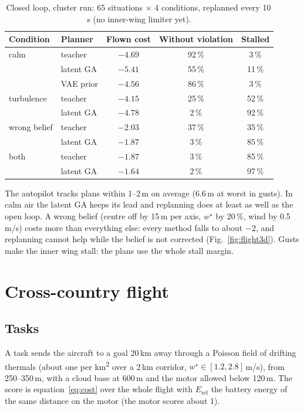 \documentclass[11pt,a4paper,oneside]{report}
\begin{document}
\begin{table}[ht]\centering\small
\caption{Closed loop, cluster run: 65 situations $\times$ 4 conditions, replanned every 10\,s (no inner-wing limiter yet).}\label{tab:closedloop}
\begin{tabular}{@{}llccc@{}}
\toprule
Condition & Planner & Flown cost & Without violation & Stalled \\ \midrule
calm & teacher & $-4.69$ & 92\,\% & 3\,\% \\
     & latent GA & $\mathbf{-5.41}$ & 55\,\% & 11\,\% \\
     & VAE prior & $-4.56$ & 86\,\% & 3\,\% \\ \midrule
turbulence & teacher & $-4.15$ & 25\,\% & 52\,\% \\
           & latent GA & $-4.78$ & 2\,\% & 92\,\% \\ \midrule
wrong belief & teacher & $-2.03$ & 37\,\% & 35\,\% \\
             & latent GA & $-1.87$ & 3\,\% & 85\,\% \\ \midrule
both & teacher & $-1.87$ & 3\,\% & 85\,\% \\
     & latent GA & $-1.64$ & 2\,\% & 97\,\% \\
\bottomrule
\end{tabular}
\end{table}

The autopilot tracks plans within 1--2\,m on average (6.6\,m at worst in gusts). In calm air the latent GA keeps its lead and replanning does at least as well as the open loop. A wrong belief (centre off by 15\,m per axis, $w^\star$ by 20\,\%, wind by 0.5\,m/s) costs more than everything else: every method falls to about $-2$, and replanning cannot help while the belief is not corrected (Fig.~\ref{fig:flight3d}). Gusts make the inner wing stall: the plans use the whole stall margin.

\chapter{Cross-country flight}\label{ch:xc}

\section{Tasks}
A task sends the aircraft to a goal 20\,km away through a Poisson field of drifting thermals (about one per km\textsuperscript{2} over a 2\,km corridor, $w^\star\in[1.2,2.8]$\,m/s), from 250--350\,m, with a cloud base at 600\,m and the motor allowed below 120\,m. The score is equation~\eqref{eq:cost} over the whole flight with $E_{\mathrm{ref}}$ the battery energy of the same distance on the motor (the motor scores about 1).
\end{document}
